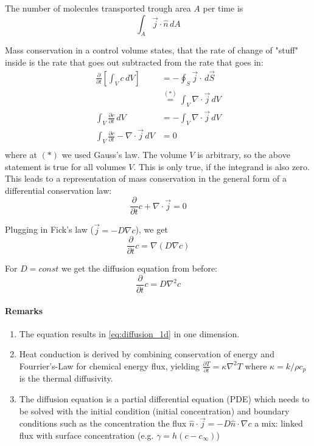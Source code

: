 The number of molecules transported trough area $A$ per time is
\begin{equation*}
	\int_A \vec j \cdot \hat n \, dA
\end{equation*}


Mass conservation in a control volume states, that the rate of change of "stuff" inside is the rate that goes out subtracted from the rate that goes in:
\begin{equation*}
	\begin{split}
	\frac \partial {\partial t}\left[\int_V c\,dV\right] &= -\oint_S \vec j \cdot \,d\vec S\\
	&\stackrel{(*)}{=} \int_V \nabla \cdot \vec j \,dV\\
	\int_V\frac{\partial c}{\partial t}\,dV &= -\int_V \nabla \cdot \vec j \,dV\\
	\int_V\frac{\partial c}{\partial t}- \nabla \cdot \vec j \,dV &= 0\\
	\end{split}
\end{equation*}
where at $(*)$ we used Gauss's law. The volume $V$ is arbitrary, so the above statement is true for all volumes $V$. This is only true, if the integrand is also zero. This leads to a representation of mass conservation in the general form of a differential conservation law:
\begin{equation*}
	\frac{\partial}{\partial t} c + \nabla \cdot \vec j = 0
\end{equation*}

Plugging in Fick's law ($\vec j = -D\nabla c$), we get
\begin{equation*}
	\frac{\partial}{\partial t}c = \nabla (D\nabla c)
\end{equation*}

For $D=const$ we get the diffusion equation from before:
\begin{equation}
	\boxed{\frac{\partial}{\partial t}c = D \nabla^2 c}
\end{equation}

\paragraph{Remarks}

\begin{enumerate}
	\setlength{\itemsep}{-5pt}
	\item The equation results in \eqref{eq:diffusion_1d} in one dimension.
	\item Heat conduction is derived by combining conservation of energy and Fourrier's-Law for chemical energy flux, yielding $\frac{\partial T}{\partial t} = \kappa \nabla ^2 T$ where $\kappa= k/\rho c_p$ is the thermal diffusivity.
	\item The diffusion equation is a partial differential equation (PDE) which needs to be solved with the initial condition (initial concentration) and boundary conditions such as
	\subitem the concentration
	\subitem the flux  $\hat n \cdot \vec j = -D\hat n  \cdot \nabla c$
	\subitem a mix: linked flux with surface concentration (e.g. $\gamma = h(c-c_\infty)$)
\end{enumerate}
 

